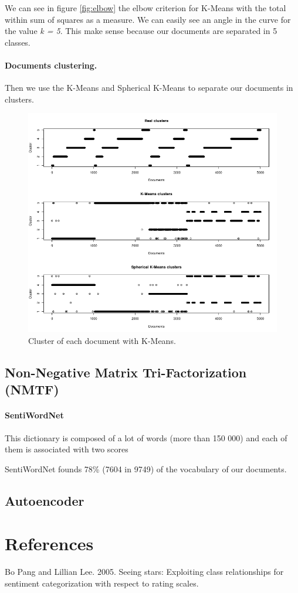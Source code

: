 \documentclass{article}
\begin{document}
We can see in figure \ref{fig:elbow} the elbow criterion for K-Means with the total within sum of squares as a measure. We can easily see an angle in the curve for the value \textit{k = 5}. This make sense because our documents are separated in 5 classes.

\paragraph{Documents clustering.}
Then we use the K-Means and Spherical K-Means to separate our documents in clusters.

\begin{figure}[h] \label{fig:kmeans}
\centering
\includegraphics[width=\textwidth]{kmeans_and_skmeans.png}
\caption{Cluster of each document with K-Means.}
\end{figure}

\subsection{Non-Negative Matrix Tri-Factorization (NMTF)}

\paragraph{SentiWordNet}
This dictionary is composed of a lot of words (more than 150 000) and each of them is associated with two scores

SentiWordNet founds 78\% (7604 in 9749) of the vocabulary of our documents.

\subsection{Autoencoder}



\section{References}
Bo Pang and Lillian Lee. 2005. Seeing stars: Exploiting class relationships for sentiment categorization with respect to rating scales.
\end{document}
